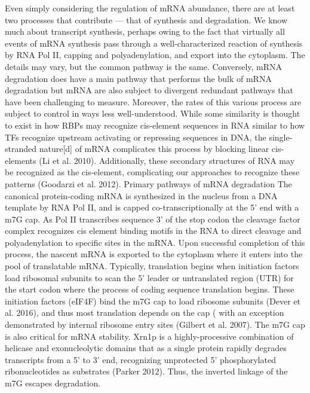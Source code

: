 Even simply considering the regulation of mRNA
abundance, there are at least two processes that contribute --- that
of synthesis and degradation. We know much about transcript synthesis,
perhaps owing to the fact that virtually all events of mRNA synthesis
pass through a well-characterized reaction of synthesis by RNA Pol II,
capping and polyadenylation, and export into the cytoplasm. The
details may vary, but the common pathway is the same. Conversely, mRNA
degradation does have a main pathway that performs the bulk of mRNA
degradation but mRNA are also subject to divergent redundant pathways
that have been challenging to measure. Moreover, the rates of this
various process are subject to control in ways less well-understood.
While some similarity is thought to exist in how RBPs may recognize
cis-element sequences in RNA similar to how TFs recognize upstream
activating or repressing sequences in DNA, the single-stranded
nature[d] of mRNA complicates this process by blocking linear
cis-elements (Li et al. 2010). Additionally, these secondary
structures of RNA may be recognized as the cis-element, complicating
our approaches to recognize these patterns (Goodarzi et al. 2012).
Primary pathways of mRNA degradation The canonical protein-coding mRNA
is synthesized in the nucleus from a DNA template by RNA Pol II, and
is capped co-transcriptionally at the 5’ end with a m7G cap. As Pol II
transcribes sequence 3’ of the stop codon the cleavage factor complex
recognizes cis element binding motifs in the RNA to direct cleavage
and polyadenylation to specific sites in the mRNA. Upon successful
completion of this process, the nascent mRNA is exported to the
cytoplasm where it enters into the pool of translatable mRNA.
Typically, translation begins when initiation factors load ribosomal
subunits to scan the 5’ leader or untranslated region (UTR) for the
start codon where the process of coding sequence translation begins.
These initiation factors (eIF4F) bind the m7G cap to load ribosome
subunits (Dever et al. 2016), and thus most translation depends on the
cap ( with an exception demonstrated by internal ribosome entry sites
(Gilbert et al. 2007). The m7G cap is also critical for mRNA
stability. Xrn1p is a highly-processive combination of helicase and
exonucleolytic domains that as a single protein rapidly degrades
transcripts from a 5’ to 3’ end, recognizing unprotected 5’
phosphorylated ribonucleotides as substrates (Parker 2012). Thus, the
inverted linkage of the m7G escapes degradation.  

